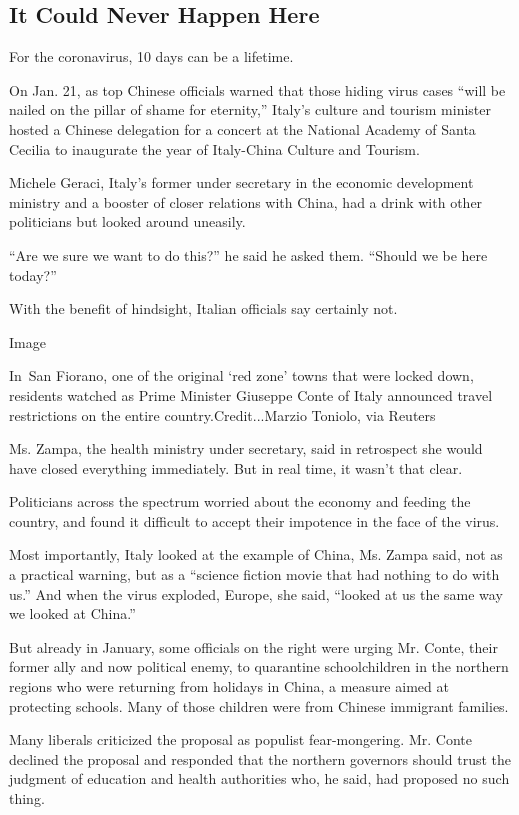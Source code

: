 \hypertarget{it-could-never-happen-here}{%
\subsection{It Could Never Happen
Here}\label{it-could-never-happen-here}}

For the coronavirus, 10 days can be a lifetime.

On Jan. 21, as top Chinese officials warned that those hiding virus
cases ``will be nailed on the pillar of shame for eternity,'' Italy's
culture and tourism minister hosted a Chinese delegation for a concert
at the National Academy of Santa Cecilia to inaugurate the year of
Italy-China Culture and Tourism.

Michele Geraci, Italy's former under secretary in the economic
development ministry and a booster of closer relations with China, had a
drink with other politicians but looked around uneasily.

``Are we sure we want to do this?'' he said he asked them. ``Should we
be here today?''

With the benefit of hindsight, Italian officials say certainly not.

Image

In~San Fiorano, one of the original `red zone' towns that were locked
down, residents watched as Prime Minister Giuseppe Conte of Italy
announced travel restrictions on the entire country.Credit...Marzio
Toniolo, via Reuters

Ms. Zampa, the health ministry under secretary, said in retrospect she
would have closed everything immediately. But in real time, it wasn't
that clear.

Politicians across the spectrum worried about the economy and feeding
the country, and found it difficult to accept their impotence in the
face of the virus.

Most importantly, Italy looked at the example of China, Ms. Zampa said,
not as a practical warning, but as a ``science fiction movie that had
nothing to do with us.'' And when the virus exploded, Europe, she said,
``looked at us the same way we looked at China.''

But already in January, some officials on the right were urging Mr.
Conte, their former ally and now political enemy, to quarantine
schoolchildren in the northern regions who were returning from holidays
in China, a measure aimed at protecting schools. Many of those children
were from Chinese immigrant families.

Many liberals criticized the proposal as populist fear-mongering. Mr.
Conte declined the proposal and responded that the northern governors
should trust the judgment of education and health authorities who, he
said, had proposed no such thing.

